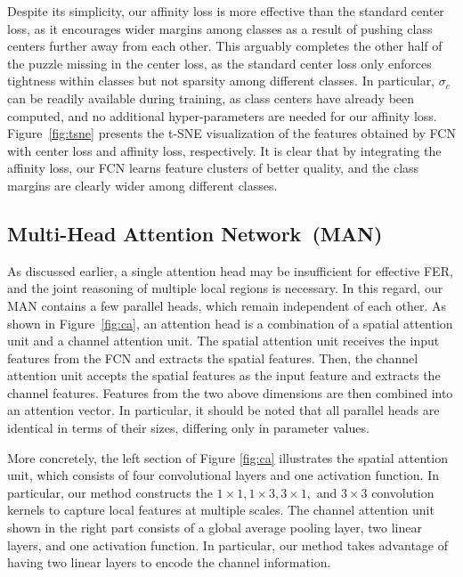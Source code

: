\documentclass{article}
\begin{document}
Despite its simplicity, our affinity loss is more effective than the standard center loss, as it encourages wider margins among classes as a result of pushing class centers further away from each other. This arguably completes the other half of the puzzle missing in the center loss, as the standard center loss only enforces tightness within classes but not sparsity among different classes. In particular, $\sigma _c$ can be readily available during training, as {class centers have already been computed}, and no additional hyper-parameters are needed for our affinity loss. Figure~\ref{fig:tsne} {presents} the t-SNE visualization of the features obtained by FCN with center loss and affinity loss, respectively. It is clear that by integrating the affinity loss, our FCN learns feature clusters of better quality, and the class margins are clearly wider among different classes. 




\subsection{Multi-Head Attention Network~(MAN)}
\label{sec:man}
As discussed earlier, a single attention head may be insufficient for effective FER, and the joint reasoning of multiple local regions is necessary. In this regard, our MAN contains a few parallel heads, which remain independent of each other. As shown in Figure~\ref{fig:ca}, an attention head is a combination of a spatial attention unit and a channel attention unit. The spatial attention unit receives the input features from the FCN and extracts the spatial features. Then, the channel attention unit accepts the spatial features as the input feature and extracts the channel features. Features from the two above dimensions are then combined into an attention vector. {In particular, it should be noted that all parallel heads are identical in terms of their sizes, differing only in parameter values.} 

More concretely, the left section of Figure \ref{fig:ca} illustrates the spatial attention unit, which consists of four convolutional layers and one activation function. In particular, our method constructs the $1 \times 1, 1 \times 3, 3 \times 1,$ and $ 3 \times 3$ convolution kernels to capture local features at multiple scales.
The channel attention unit shown in the right part consists of a global average pooling layer, two linear layers, and one activation function. In particular, our method takes advantage of having two linear layers to encode the channel information.
\end{document}
